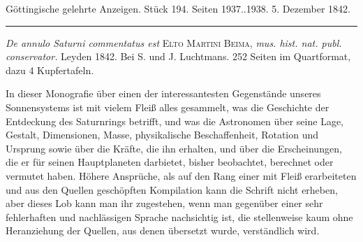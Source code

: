 \clearpage
{}
\hypertarget{native-659-middle}{}
\begin{center}\small Göttingische gelehrte Anzeigen. Stück 194. Seiten 1937..1938. 5. Dezember 1842.\\[3pt]\rule{.72\linewidth}{.3pt}\end{center}

\emph{De annulo Saturni commentatus est} \textsc{Elto Martini Beima}, \emph{mus. hist. nat. publ. conservator.} Leyden 1842. Bei S. und J. Luchtmans. 252 Seiten im Quartformat, dazu 4 Kupfertafeln.

In dieser Monografie über einen der interessantesten Gegenstände unseres Sonnensystems ist mit vielem Fleiß alles gesammelt, was die Geschichte der Entdeckung des Saturnrings betrifft, und was die Astronomen über seine Lage, Gestalt, Dimensionen, Masse, physikalische Beschaffenheit, Rotation und Ursprung sowie über die Kräfte, die ihn erhalten, und über die Erscheinungen, die er für seinen Hauptplaneten darbietet, bisher beobachtet, berechnet oder vermutet haben. Höhere Ansprüche, als auf den Rang einer mit Fleiß erarbeiteten und aus den Quellen geschöpften Kompilation kann die Schrift nicht erheben, aber dieses Lob kann man ihr zugestehen, wenn man gegenüber einer sehr fehlerhaften und nachlässigen Sprache nachsichtig ist, die stellenweise kaum ohne Heranziehung der Quellen, aus denen übersetzt wurde, verständlich wird.
